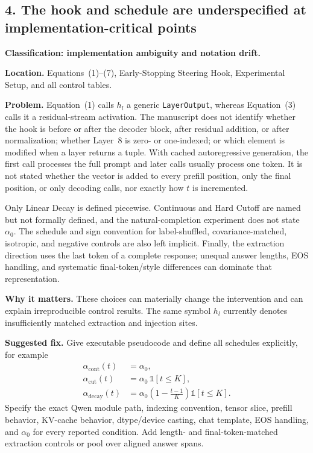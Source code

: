 \documentclass[11pt]{article}
\begin{document}
\subsection*{4. The hook and schedule are underspecified at implementation-critical points}

\textbf{Classification: implementation ambiguity and notation drift.}

\textbf{Location.} Equations~(1)--(7), Early-Stopping Steering Hook, Experimental Setup, and all control tables.

\textbf{Problem.} Equation~(1) calls $h_l$ a generic \texttt{LayerOutput}, whereas Equation~(3) calls it a residual-stream activation.  The manuscript does not identify whether the hook is before or after the decoder block, after residual addition, or after normalization; whether Layer~8 is zero- or one-indexed; or which element is modified when a layer returns a tuple.  With cached autoregressive generation, the first call processes the full prompt and later calls usually process one token.  It is not stated whether the vector is added to every prefill position, only the final position, or only decoding calls, nor exactly how $t$ is incremented.

Only Linear Decay is defined piecewise.  Continuous and Hard Cutoff are named but not formally defined, and the natural-completion experiment does not state $\alpha_0$.  The schedule and sign convention for label-shuffled, covariance-matched, isotropic, and negative controls are also left implicit.  Finally, the extraction direction uses the last token of a complete response; unequal answer lengths, EOS handling, and systematic final-token/style differences can dominate that representation.

\textbf{Why it matters.} These choices can materially change the intervention and can explain irreproducible control results.  The same symbol $h_l$ currently denotes insufficiently matched extraction and injection sites.

\textbf{Suggested fix.} Give executable pseudocode and define all schedules explicitly, for example
\begin{align*}
 \alpha_{\mathrm{cont}}(t)&=\alpha_0,\\
 \alpha_{\mathrm{cut}}(t)&=\alpha_0\,\mathbb{1}[t\le K],\\
 \alpha_{\mathrm{decay}}(t)&=\alpha_0\left(1-\frac{t-1}{K}\right)\mathbb{1}[t\le K].
\end{align*}
Specify the exact Qwen module path, indexing convention, tensor slice, prefill behavior, KV-cache behavior, dtype/device casting, chat template, EOS handling, and $\alpha_0$ for every reported condition.  Add length- and final-token-matched extraction controls or pool over aligned answer spans.
\end{document}
